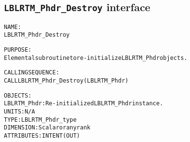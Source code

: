 \subsection{\texttt{LBLRTM\_Phdr\_Destroy} interface}
  \label{sec:LBLRTM_Phdr_Destroy_interface}
  \begin{alltt}
 
  NAME:
        LBLRTM_Phdr_Destroy
 
  PURPOSE:
        Elemental subroutine to re-initialize LBLRTM_Phdr objects.
 
  CALLING SEQUENCE:
        CALL LBLRTM_Phdr_Destroy( LBLRTM_Phdr )
 
  OBJECTS:
        LBLRTM_Phdr:  Re-initialized LBLRTM_Phdr instance.
                      UNITS:      N/A
                      TYPE:       LBLRTM_Phdr_type
                      DIMENSION:  Scalar or any rank
                      ATTRIBUTES: INTENT(OUT)
 
  \end{alltt}
